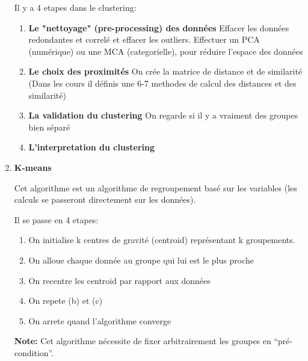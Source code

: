 \documentclass[a4paper, 11pt, onecolumn]{article}
\begin{document}
\begin{enumerate}
  \begin{description}
  \end{description}


Il y a 4 etapes dans le clustering:
\begin{enumerate}
\item \textbf{Le "nettoyage" (pre-processing) des données}
Effacer les données redondantes et correlé et effacer les outliers.
Effectuer un PCA (numérique) ou une MCA (categorielle), pour réduire l'espace des données
\item \textbf{Le choix des proximités}
On crée la matrice de distance et de similarité (Dans les cours il définis une 6-7 methodes de calcul des distances et des similarité)
\item \textbf{La validation du clustering} On regarde si il y a vraiment des groupes bien séparé
\item \textbf{L'interpretation du clustering}
\end{enumerate}

\item \textbf{K-means}

Cet algorithme est un algorithme de regroupement basé sur les variables (les calculs se passeront directement sur les données).

Il se passe en 4 etapes:
\begin{enumerate}
\item On initialise k centres de gravité (centroid) représentant k groupements.
\item On alloue chaque donnée au groupe qui lui est le plus proche
\item On recentre les centroid par rapport aux données
\item On repete (b) et (c)
\item On arrete quand l'algorithme converge
\end{enumerate}

\textbf{Note:} Cet algorithme nécessite de fixer arbitrairement les groupes en ``pré-condition''.


\end{enumerate}
\end{document}
